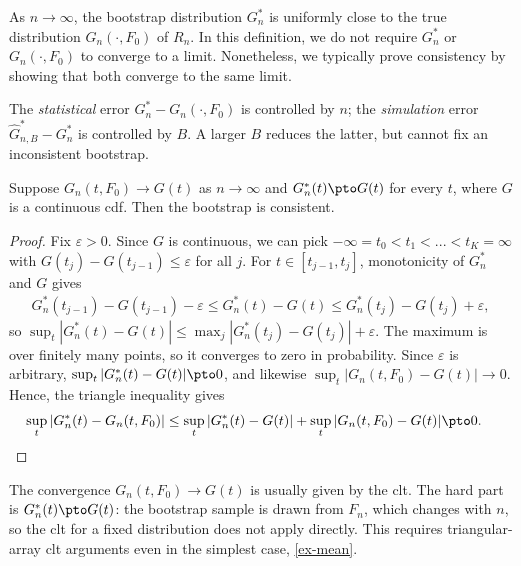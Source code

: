 \documentclass[a4paper,12pt]{article}
\begin{document}
\begin{remark}[Interpretation]
	As $n\to\infty$,
	the bootstrap distribution $G_n^*$ is uniformly close to the true distribution $G_n(\cdot,F_0)$ of $R_n$.
	In this definition, we do not require $G_n^*$ or $G_n(\cdot,F_0)$ to converge to a limit.
	Nonetheless, we typically prove consistency by showing that both converge to the same limit.
\end{remark}

\begin{remark}
	The \emph{statistical} error $G_n^*-G_n(\cdot,F_0)$ is controlled by $n$;
	the \emph{simulation} error $\widehat G_{n,B}^*-G_n^*$ is controlled by $B$.
	A larger $B$ reduces the latter, but cannot fix an inconsistent bootstrap.
\end{remark}

\begin{lemma}\label{lem-consistency}
	Suppose $G_n(t,F_0)\to G(t)$ as $n\to\infty$ and $G_n^*(t)\pto G(t)$ for every $t$, where $G$ is a continuous \gls{cdf}.
	Then the bootstrap is consistent.
\end{lemma}
\begin{proof}
	Fix $\varepsilon>0$.
	Since $G$ is continuous, we can pick $-\infty=t_0<t_1<...<t_K=\infty$ with $G(t_j)-G(t_{j-1})\le\varepsilon$ for all $j$.
	For $t\in[t_{j-1},t_j]$, monotonicity of $G_n^*$ and $G$ gives
	\begin{align}
		G_n^*(t_{j-1})-G(t_{j-1})-\varepsilon
		\le G_n^*(t)-G(t)
		\le G_n^*(t_j)-G(t_j)+\varepsilon,
	\end{align}
	so $\sup_t|G_n^*(t)-G(t)|\le\max_j|G_n^*(t_j)-G(t_j)|+\varepsilon$.
	The maximum is over finitely many points, so it converges to zero in probability.
	Since $\varepsilon$ is arbitrary, $\sup_t|G_n^*(t)-G(t)|\pto0$, and likewise $\sup_t|G_n(t,F_0)-G(t)|\to0$.
	Hence, the triangle inequality gives
	\begin{align*}
		\sup_t|G_n^*(t)-G_n(t,F_0)|
		&\le\sup_t|G_n^*(t)-G(t)|+\sup_t|G_n(t,F_0)-G(t)|
		\pto0.
		\qedhere
	\end{align*}
\end{proof}

\begin{remark}
	The convergence $G_n(t,F_0)\to G(t)$ is usually given by the \gls{clt}.
	The hard part is $G_n^*(t)\pto G(t)$:
	the bootstrap sample is drawn from $F_n$, which changes with $n$,
	so the \gls{clt} for a fixed distribution does not apply directly.
	This requires triangular-array \gls{clt} arguments even in the simplest case, \autoref{ex-mean}.
\end{remark}
\end{document}
